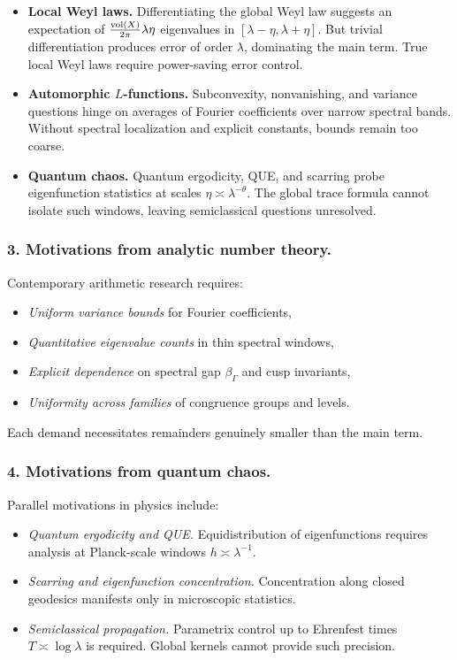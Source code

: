 \begin{itemize}
  \item \textbf{Local Weyl laws.}
        Differentiating the global Weyl law suggests an expectation
        of $\tfrac{\operatorname{vol}(X)}{2\pi}\lambda\eta$ eigenvalues in $[\lambda-\eta,\lambda+\eta]$.
        But trivial differentiation produces error of order $\lambda$, dominating the main term.
        True local Weyl laws require power-saving error control.

  \item \textbf{Automorphic $L$-functions.}
        Subconvexity, nonvanishing, and variance questions hinge on averages of Fourier coefficients
        over narrow spectral bands. Without spectral localization and explicit constants,
        bounds remain too coarse.

  \item \textbf{Quantum chaos.}
        Quantum ergodicity, QUE, and scarring probe eigenfunction statistics at scales
        $\eta\asymp\lambda^{-\theta}$. The global trace formula cannot isolate such windows,
        leaving semiclassical questions unresolved.
\end{itemize}

\subsubsection*{3. Motivations from analytic number theory.}
Contemporary arithmetic research requires:
\begin{itemize}
  \item \emph{Uniform variance bounds} for Fourier coefficients,
  \item \emph{Quantitative eigenvalue counts} in thin spectral windows,
  \item \emph{Explicit dependence} on spectral gap $\beta_\Gamma$ and cusp invariants,
  \item \emph{Uniformity across families} of congruence groups and levels.
\end{itemize}
Each demand necessitates remainders genuinely smaller than the main term.

\subsubsection*{4. Motivations from quantum chaos.}
Parallel motivations in physics include:
\begin{itemize}
  \item \emph{Quantum ergodicity and QUE.}  
        Equidistribution of eigenfunctions requires analysis at Planck-scale windows
        $h\asymp\lambda^{-1}$.
  \item \emph{Scarring and eigenfunction concentration.}  
        Concentration along closed geodesics manifests only in microscopic statistics.
  \item \emph{Semiclassical propagation.}  
        Parametrix control up to Ehrenfest times $T\asymp\log\lambda$ is required.
        Global kernels cannot provide such precision.
\end{itemize}

